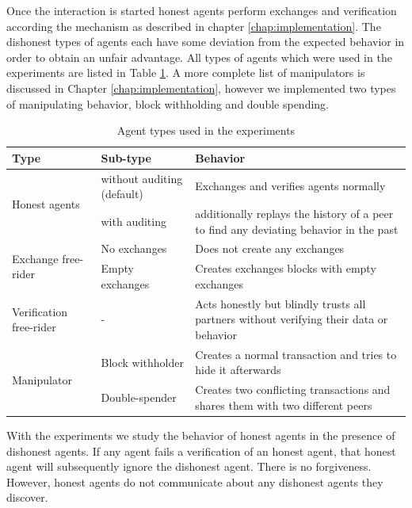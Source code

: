 Once the interaction is started honest agents perform exchanges and verification according the 
mechanism as described in chapter \ref{chap:implementation}. The dishonest types of agents each have 
some deviation from the expected behavior in order to obtain an unfair advantage. 
All types of agents which were used in the experiments are listed in Table \ref{tab:agent_types}.
A more complete list of manipulators is discussed in Chapter \ref{chap:implementation}, however we 
implemented two types of manipulating behavior, block withholding and double spending.

\begin{table}
    \caption{Agent types used in the experiments}
    \label{tab:agent_types}
    \begin{tabular}{p{3cm}|p{3cm}|p{8cm}} \toprule
    \textbf{Type} & \textbf{Sub-type} & \textbf{Behavior} \\ \midrule
    \multirow{2}{3cm}{Honest agents} & without auditing (default) & Exchanges and verifies agents normally \\ \cline{2-3}
    & with auditing & additionally replays the history of a peer to find any deviating behavior in the past \\ \midrule
    \multirow{2}{3cm}{Exchange free-rider} & No exchanges & Does not create any exchanges \\ \cline{2-3}
    & Empty exchanges & Creates exchanges blocks with empty exchanges \\ 
    \midrule
    Verification free-rider & - & Acts honestly but blindly trusts all partners without verifying their data or behavior \\ \midrule
    \multirow{2}{3cm}{Manipulator } & Block withholder & Creates a normal transaction and tries to hide it afterwards \\ \cline{2-3}
    & Double-spender & Creates two conflicting transactions and shares them with two different peers \\ \bottomrule
    \end{tabular}
\end{table}
    
With the experiments we study the behavior of honest agents in the presence of dishonest agents. If 
any agent fails a verification of an honest agent, that honest agent will subsequently ignore the 
dishonest agent. There is no forgiveness. However, honest agents do not communicate about any 
dishonest agents they discover.

